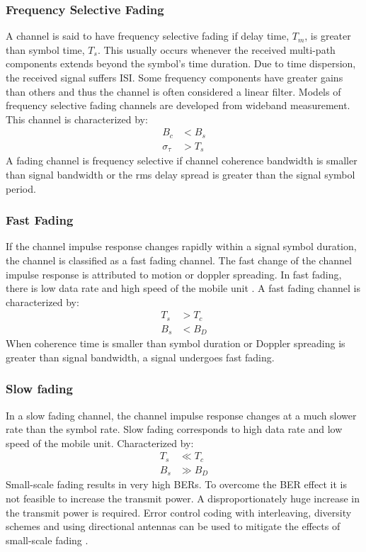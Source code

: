 \subsubsection{Frequency Selective Fading}
A channel is said to have frequency selective fading if delay time, $T_m$, is greater than symbol time, $T_s$. This usually occurs whenever the received multi-path components extends beyond the symbol's time duration. Due to time dispersion, the received signal suffers \gls{ISI}.
Some frequency components have greater gains than others and thus the channel is often considered a linear filter\cite{fuqin}. Models of frequency selective fading channels are developed from wideband measurement. This channel is characterized by:
\begin{align*}
B_c &< B_s\\
\sigma_\tau &> T_s
\end{align*}
A fading channel is frequency selective if channel coherence bandwidth is smaller than signal bandwidth or the rms delay spread is greater than the signal symbol period\cite{fuqin}.

\subsubsection{Fast Fading}
If the channel impulse response changes rapidly within a signal symbol duration, the channel is classified as a fast fading channel. The fast change of the channel impulse response is attributed to motion or doppler spreading. In fast fading, there is low data rate and high speed of the mobile unit \cite{fuqin}. A fast fading channel is characterized by:
\begin{align*}
T_s &> T_c\\
B_s &< B_D
\end{align*}
When coherence time is smaller than symbol duration or Doppler spreading is greater than signal bandwidth, a signal undergoes fast fading\cite{fuqin}.

\subsubsection{Slow fading}
In a slow fading channel, the channel impulse response changes at a much slower rate than the symbol rate. Slow fading corresponds to high data rate and low speed of the mobile unit\cite{fuqin}. Characterized by:
\begin{align*}
T_s &\ll T_c\\
B_s &\gg B_D
\end{align*}
Small-scale fading results in very high \gls{BER}s. To overcome the \gls{BER} effect it is not feasible to increase the transmit power. A disproportionately huge increase in the transmit power is required. Error control coding with interleaving, diversity schemes and using directional antennas can be used to mitigate the effects of small-scale fading \cite{Hindu}.

